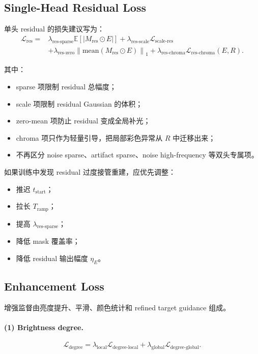 \documentclass[11pt]{article}
\begin{document}
\subsection{Single-Head Residual Loss}

单头 residual 的损失建议写为：
\begin{align}
    \mathcal{L}_{\text{res}}
    ={}&
    \lambda_{\text{res-sparse}}
    \mathbb{E}
    \left[
        \left|M_{\text{res}}\odot E\right|
    \right]
    +
    \lambda_{\text{res-scale}}
    \mathcal{L}_{\text{scale-res}}
    \nonumber \\
    &+
    \lambda_{\text{res-zero}}
    \left\|
        \mathrm{mean}(M_{\text{res}}\odot E)
    \right\|_1
    +
    \lambda_{\text{res-chroma}}
    \mathcal{L}_{\text{res-chroma}}(E, R).
\end{align}

其中：
\begin{itemize}[leftmargin=1.5em]
    \item sparse 项限制 residual 总幅度；
    \item scale 项限制 residual Gaussian 的体积；
    \item zero-mean 项防止 residual 变成全局补光；
    \item chroma 项只作为轻量引导，把局部彩色异常从 $R$ 中迁移出来；
    \item 不再区分 noise sparse、artifact sparse、noise high-frequency 等双头专属项。
\end{itemize}

如果训练中发现 residual 过度接管重建，应优先调整：
\begin{itemize}[leftmargin=1.5em]
    \item 推迟 $t_{\text{start}}$；
    \item 拉长 $T_{\text{ramp}}$；
    \item 提高 $\lambda_{\text{res-sparse}}$；
    \item 降低 mask 覆盖率；
    \item 降低 residual 输出幅度 $\eta_E$。
\end{itemize}

\subsection{Enhancement Loss}

增强监督由亮度提升、平滑、颜色统计和 refined target guidance 组成。

\paragraph{(1) Brightness degree.}
\begin{equation}
    \mathcal{L}_{\text{degree}}
    =
    \lambda_{\text{local}}
    \mathcal{L}_{\text{degree-local}}
    +
    \lambda_{\text{global}}
    \mathcal{L}_{\text{degree-global}}.
\end{equation}
\end{document}
